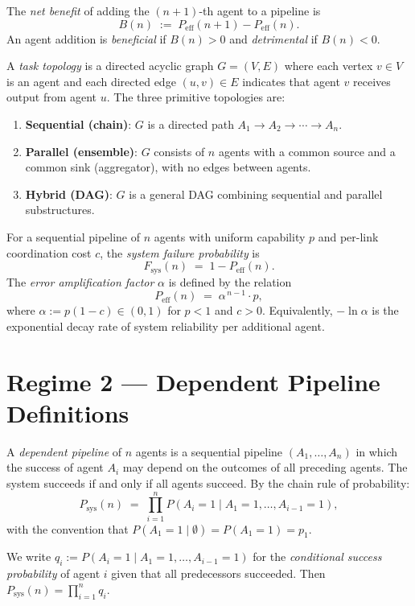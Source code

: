 \begin{definition}
\label{def:net-benefit}
The \emph{net benefit} of adding the $(n+1)$-th agent to a pipeline is
\[
  B(n) \;:=\; P_{\mathrm{eff}}(n+1) - P_{\mathrm{eff}}(n).
\]
An agent addition is \emph{beneficial} if $B(n) > 0$ and \emph{detrimental} if $B(n) < 0$.
\end{definition}

\begin{definition}
\label{def:topology}
A \emph{task topology} is a directed acyclic graph $G = (V, E)$ where each vertex
$v \in V$ is an agent and each directed edge $(u, v) \in E$ indicates that agent $v$
receives output from agent $u$. The three primitive topologies are:
\begin{enumerate}
  \item \textbf{Sequential (chain)}: $G$ is a directed path $A_1 \to A_2 \to \cdots \to A_n$.
  \item \textbf{Parallel (ensemble)}: $G$ consists of $n$ agents with a common source and a
        common sink (aggregator), with no edges between agents.
  \item \textbf{Hybrid (DAG)}: $G$ is a general DAG combining sequential and parallel
        substructures.
\end{enumerate}
\end{definition}

\begin{definition}
\label{def:error-amp}
For a sequential pipeline of $n$ agents with uniform capability $p$ and per-link
coordination cost $c$, the \emph{system failure probability} is
\[
  F_{\mathrm{sys}}(n) \;=\; 1 - P_{\mathrm{eff}}(n).
\]
The \emph{error amplification factor} $\alpha$ is defined by the relation
\[
  P_{\mathrm{eff}}(n) \;=\; \alpha^{\,n-1} \cdot p,
\]
where $\alpha := p(1-c) \in (0,1)$ for $p < 1$ and $c > 0$. Equivalently, $-\ln \alpha$
is the exponential decay rate of system reliability per additional agent.
\end{definition}

\section{Regime 2 --- Dependent Pipeline Definitions}

\begin{definition}
\label{def:dependent-pipeline}
A \emph{dependent pipeline} of $n$ agents is a sequential pipeline $(A_1, \ldots, A_n)$
in which the success of agent $A_i$ may depend on the outcomes of all preceding agents.
The system succeeds if and only if all agents succeed. By the chain rule of probability:
\[
  P_{\mathrm{sys}}(n) \;=\; \prod_{i=1}^{n} P(A_i = 1 \mid A_1 = 1, \ldots, A_{i-1} = 1),
\]
with the convention that $P(A_1 = 1 \mid \emptyset) = P(A_1 = 1) = p_1$.

We write $q_i := P(A_i = 1 \mid A_1 = 1, \ldots, A_{i-1} = 1)$ for the \emph{conditional
success probability} of agent $i$ given that all predecessors succeeded. Then
$P_{\mathrm{sys}}(n) = \prod_{i=1}^{n} q_i$.
\end{definition}

